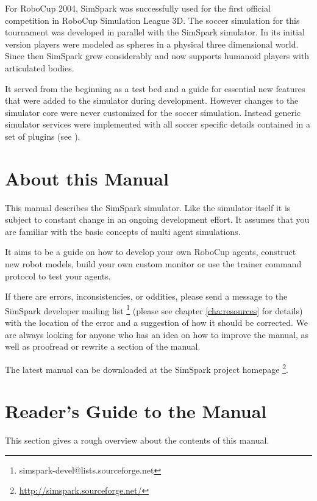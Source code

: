For RoboCup 2004, SimSpark was successfully used for the first
official competition in RoboCup Simulation League 3D.  The soccer
simulation for this tournament was developed in parallel with the
SimSpark simulator. In its initial version players were modeled as
spheres in a physical three dimensional world. Since then SimSpark
grew considerably and now supports humanoid players with
articulated bodies.

It served from the beginning as a test bed and a guide for essential
new features that were added to the simulator during
development. However changes to the simulator core were never
customized for the soccer simulation. Instead generic
simulator services were implemented with all soccer specific
details contained in a set of plugins (see \cite{OR05}).

\section{About this Manual}


This manual describes the SimSpark simulator. Like the simulator
itself it is subject to constant change in an ongoing development
effort. It assumes that you are familiar with the basic concepts of
multi agent simulations.

It aims to be a guide on how to develop your own RoboCup agents,
construct new robot models, build your own custom monitor or use the
trainer command protocol to test your agents.

If there are errors, inconsistencies, or oddities, please send a
message to the SimSpark developer mailing list
\footnote{simspark-devel@lists.sourceforge.net} (please see chapter
\ref{cha:resources} for details) with the location of the error and a
suggestion of how it should be corrected. We are always looking for
anyone who has an idea on how to improve the manual, as well as
proofread or rewrite a section of the manual.

The latest manual can be downloaded at the SimSpark project homepage
\footnote{\url{http://simspark.sourceforge.net/}}.

\section{Reader's Guide to the Manual}

This section gives a rough overview about the contents of this manual.

